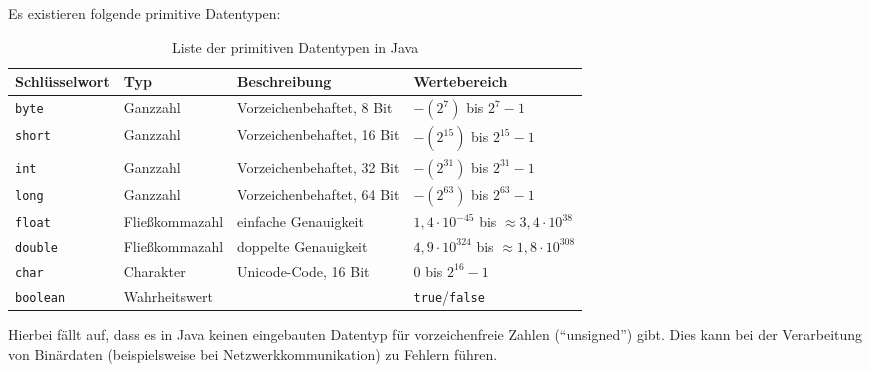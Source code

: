 		Es existieren folgende primitive Datentypen:
		\begin{table}[H]
			\centering
			\begin{tabular}{l | l | l | l}
				Schlüsselwort       & Typ            & Beschreibung               & Wertebereich                                                      \\ \hline
				\lstinline|byte|    & Ganzzahl       & Vorzeichenbehaftet, 8 Bit  & \( -(2 ^ { 7}) \) bis \( 2 ^ { 7} - 1 \)                          \\
				\lstinline|short|   & Ganzzahl       & Vorzeichenbehaftet, 16 Bit & \( -(2 ^ {15}) \) bis \( 2 ^ {15} - 1 \)                          \\
				\lstinline|int|     & Ganzzahl       & Vorzeichenbehaftet, 32 Bit & \( -(2 ^ {31}) \) bis \( 2 ^ {31} - 1 \)                          \\
				\lstinline|long|    & Ganzzahl       & Vorzeichenbehaftet, 64 Bit & \( -(2 ^ {63}) \) bis \( 2 ^ {63} - 1 \)                          \\
				\lstinline|float|   & Fließkommazahl & einfache Genauigkeit       & \( 1,4 \cdot 10 ^ {-45} \) bis \( \approx 3,4 \cdot 10 ^ {38} \)  \\
				\lstinline|double|  & Fließkommazahl & doppelte Genauigkeit       & \( 4,9 \cdot 10 ^ {324} \) bis \( \approx 1,8 \cdot 10 ^ {308} \) \\
				\lstinline|char|    & Charakter      & Unicode-Code, 16 Bit       & \( 0 \) bis \( 2 ^ {16} - 1 \)                                    \\
				\lstinline|boolean| & Wahrheitswert  &                            & \texttt{true}/\texttt{false}
			\end{tabular}
			\caption{Liste der primitiven Datentypen in Java}
		\end{table}
		
		Hierbei fällt auf, dass es in Java keinen eingebauten Datentyp für vorzeichenfreie Zahlen (\enquote{unsigned}) gibt. Dies kann bei der Verarbeitung von Binärdaten (beispielsweise bei Netzwerkkommunikation) zu Fehlern führen.
	
